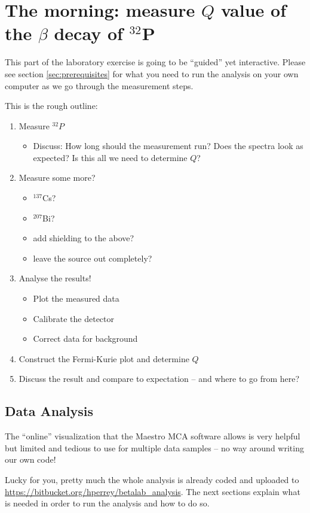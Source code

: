 \documentclass[a4,11pt, notitlepage]{article}
\begin{document}
\section{The morning: measure $Q$ value of the $\beta$ decay of $^{32}$P}
This part of the laboratory exercise is going to be ``guided'' yet
interactive. Please see section \ref{sec:prerequisites} for what you
need to run the analysis on your own computer as we go through the measurement steps.

This is the rough outline:
\begin{enumerate}
\item Measure $^{32}P$
  \begin{itemize}
  \item Discuss: How long should the measurement run? Does the spectra
    look as expected? Is this all we need to determine $Q$?
  \end{itemize}
\item Measure some more?
  \begin{itemize}
  \item $^{137}$Cs?
  \item $^{207}$Bi?
  \item add shielding to the above?
  \item leave the source out completely?
  \end{itemize}
\item Analyse the results!
  \begin{itemize}
  \item Plot the measured data
  \item Calibrate the detector
  \item Correct data for background
  \end{itemize}
\item Construct the Fermi-Kurie plot and determine $Q$
\item Discuss the result and compare to expectation -- and where to go
  from here?
\end{enumerate}

\subsection{Data Analysis}
\label{sec:data-analysis}

The ``online'' visualization that the Maestro MCA software allows is
very helpful but limited and tedious to use for multiple data samples
-- no way around writing our own code!

Lucky for you, pretty much the whole analysis is already coded and
uploaded to
\url{https://bitbucket.org/hperrey/betalab_analysis}. The next
sections explain what is needed in order to run the analysis and how
to do so.
\end{document}
